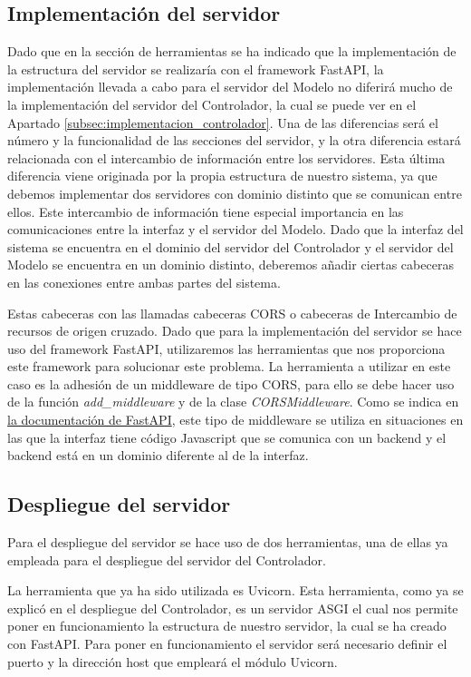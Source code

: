 \subsection{Implementación del servidor}

Dado que en la sección de herramientas se ha indicado que la implementación de la estructura del servidor se realizaría con el framework FastAPI, la implementación llevada a cabo para el servidor del Modelo no diferirá mucho de la implementación del servidor del Controlador, la cual se puede ver en el Apartado \ref{subsec:implementacion_controlador}. Una de las diferencias será el número y la funcionalidad de las secciones del servidor, y la otra diferencia estará relacionada con el intercambio de información entre los servidores. Esta última diferencia viene originada por la propia estructura de nuestro sistema, ya que debemos implementar dos servidores con dominio distinto que se comunican entre ellos. Este intercambio de información tiene especial importancia en las comunicaciones entre la interfaz y el servidor del Modelo. Dado que la interfaz del sistema se encuentra en el dominio del servidor del Controlador y el servidor del Modelo se encuentra en un dominio distinto, deberemos añadir ciertas cabeceras en las conexiones entre ambas partes del sistema.

Estas cabeceras con las llamadas cabeceras CORS o cabeceras de Intercambio de recursos de origen cruzado. Dado que para la implementación del servidor se hace uso del framework FastAPI, utilizaremos las herramientas que nos proporciona este framework para solucionar este problema. La herramienta a utilizar en este caso es la adhesión de un middleware de tipo CORS, para ello se debe hacer uso de la función \textit{add\_middleware} y de la clase \textit{CORSMiddleware}. Como se indica en \href{https://fastapi.tiangolo.com/tutorial/cors/}{la documentación de FastAPI}, este tipo de middleware se utiliza en situaciones en las que la interfaz tiene código Javascript que se comunica con un backend y el backend está en un dominio diferente al de la interfaz.

\subsection{Despliegue del servidor}

Para el despliegue del servidor se hace uso de dos herramientas, una de ellas ya empleada para el despliegue del servidor del Controlador.

La herramienta que ya ha sido utilizada es Uvicorn. Esta herramienta, como ya se explicó en el despliegue del Controlador, es un servidor ASGI el cual nos permite poner en funcionamiento la estructura de nuestro servidor, la cual se ha creado con FastAPI. Para poner en funcionamiento el servidor será necesario definir el puerto y la dirección host que empleará el módulo Uvicorn.

